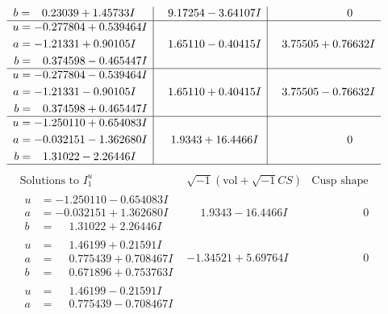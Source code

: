 \documentclass[1p]{elsarticle_modified}
\theoremstyle{definition}
\newcommand{\I}{\sqrt{-1}}
\begin{document}
$$\begin{array}{c|c|c}
\begin{aligned}
b &= \phantom{-}0.23039 + 1.45733 I\end{aligned}
 & \phantom{-}9.17254 - 3.64107 I & \phantom{-0.000000 } 0 \\ \hline\begin{aligned}
u &= -0.277804 + 0.539464 I \\
a &= -1.21331 + 0.90105 I \\
b &= \phantom{-}0.374598 - 0.465447 I\end{aligned}
 & \phantom{-}1.65110 - 0.40415 I & \phantom{-}3.75505 + 0.76632 I \\ \hline\begin{aligned}
u &= -0.277804 - 0.539464 I \\
a &= -1.21331 - 0.90105 I \\
b &= \phantom{-}0.374598 + 0.465447 I\end{aligned}
 & \phantom{-}1.65110 + 0.40415 I & \phantom{-}3.75505 - 0.76632 I \\ \hline\begin{aligned}
u &= -1.250110 + 0.654083 I \\
a &= -0.032151 - 1.362680 I \\
b &= \phantom{-}1.31022 - 2.26446 I\end{aligned}
 & \phantom{-}1.9343 + 16.4466 I & \phantom{-0.000000 } 0\\
 \hline 
 \end{array}$$\newpage$$\begin{array}{c|c|c}  
\text{Solutions to }I^u_{1}& \I (\text{vol} + \sqrt{-1}CS) & \text{Cusp shape}\\
 \hline 
\begin{aligned}
u &= -1.250110 - 0.654083 I \\
a &= -0.032151 + 1.362680 I \\
b &= \phantom{-}1.31022 + 2.26446 I\end{aligned}
 & \phantom{-}1.9343 - 16.4466 I & \phantom{-0.000000 } 0 \\ \hline\begin{aligned}
u &= \phantom{-}1.46199 + 0.21591 I \\
a &= \phantom{-}0.775439 + 0.708467 I \\
b &= \phantom{-}0.671896 + 0.753763 I\end{aligned}
 & -1.34521 + 5.69764 I & \phantom{-0.000000 } 0 \\ \hline\begin{aligned}
u &= \phantom{-}1.46199 - 0.21591 I \\
a &= \phantom{-}0.775439 - 0.708467 I \\

\end{aligned}
\end{array}$$
\end{document}
